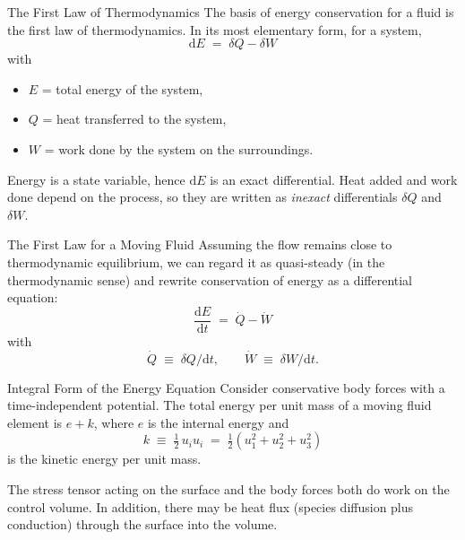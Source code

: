 \documentclass[10pt,aspectratio=43]{beamer}
\newcommand{\dd}{\mathrm{d}}
\begin{document}
\begin{frame}{The First Law of Thermodynamics}
  The basis of energy conservation for a fluid is the first law of
  thermodynamics. In its most elementary form, for a system,
  \[
    \dd E \;=\; \delta Q - \delta W
  \]
  with
  \begin{itemize}
    \item $E$ = total energy of the system,
    \item $Q$ = heat transferred to the system,
    \item $W$ = work done by the system on the surroundings.
  \end{itemize}
  Energy is a state variable, hence $\dd E$ is an exact differential. Heat
  added and work done depend on the process, so they are written as
  \emph{inexact} differentials $\delta Q$ and $\delta W$.
\end{frame}

\begin{frame}{The First Law for a Moving Fluid}
  Assuming the flow remains close to thermodynamic equilibrium, we can
  regard it as quasi-steady (in the thermodynamic sense) and rewrite
  conservation of energy as a differential equation:
  \[
    \frac{\dd E}{\dd t} \;=\; \dot{Q} - \dot{W}
  \]
  with
  \[
    \dot{Q} \;\equiv\; \delta Q/\dd t, \qquad
    \dot{W} \;\equiv\; \delta W/\dd t.
  \]
\end{frame}

\begin{frame}{Integral Form of the Energy Equation}
  Consider conservative body forces with a time-independent potential. The
  total energy per unit mass of a moving fluid element is $e+k$, where $e$
  is the internal energy and
  \[
    k \;\equiv\; \tfrac{1}{2}\,u_{i}u_{i}
            \;=\; \tfrac{1}{2}(u_{1}^{2}+u_{2}^{2}+u_{3}^{2})
  \]
  is the kinetic energy per unit mass.

  \medskip
  The stress tensor acting on the surface and the body forces both do work
  on the control volume. In addition, there may be heat flux (species
  diffusion plus conduction) through the surface into the volume.
\end{frame}
\end{document}
